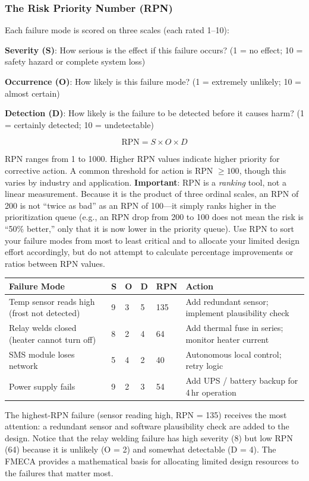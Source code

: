 \documentclass[11pt,letterpaper,twoside,openany]{book}
\begin{document}
\subsubsection{The Risk Priority Number (RPN)}
Each failure mode is scored on three scales (each rated 1--10):

\textbf{Severity (S)}: How serious is the effect if this failure occurs? (1 = no effect; 10 = safety hazard or complete system loss)

\textbf{Occurrence (O)}: How likely is this failure mode? (1 = extremely unlikely; 10 = almost certain)

\textbf{Detection (D)}: How likely is the failure to be detected before it causes harm? (1 = certainly detected; 10 = undetectable)

\[
\text{RPN} = S \times O \times D
\]

RPN ranges from 1 to 1000. Higher RPN values indicate higher priority for corrective action. A common threshold for action is RPN $\geq 100$, though this varies by industry and application. \textbf{Important}: RPN is a \emph{ranking} tool, not a linear measurement. Because it is the product of three ordinal scales, an RPN of 200 is not ``twice as bad'' as an RPN of 100---it simply ranks higher in the prioritization queue (e.g., an RPN drop from 200 to 100 does not mean the risk is ``50\% better,'' only that it is now lower in the priority queue). Use RPN to sort your failure modes from most to least critical and to allocate your limited design effort accordingly, but do not attempt to calculate percentage improvements or ratios between RPN values.

\begin{keyconceptbox}
\begin{center}\small
\begin{tabularx}{\textwidth}{X l l l l X}
\toprule
\textbf{Failure Mode} & \textbf{S} & \textbf{O} & \textbf{D} & \textbf{RPN} & \textbf{Action} \\
\midrule
Temp sensor reads high (frost not detected) & 9 & 3 & 5 & 135 & Add redundant sensor; implement plausibility check \\
Relay welds closed (heater cannot turn off) & 8 & 2 & 4 & 64 & Add thermal fuse in series; monitor heater current \\
SMS module loses network & 5 & 4 & 2 & 40 & Autonomous local control; retry logic \\
Power supply fails & 9 & 2 & 3 & 54 & Add UPS / battery backup for 4\,hr operation \\
\bottomrule
\end{tabularx}
\end{center}

The highest-RPN failure (sensor reading high, RPN = 135) receives the most attention: a redundant sensor and software plausibility check are added to the design. Notice that the relay welding failure has high severity (8) but low RPN (64) because it is unlikely (O = 2) and somewhat detectable (D = 4). The FMECA provides a mathematical basis for allocating limited design resources to the failures that matter most.
\end{keyconceptbox}
\end{document}
